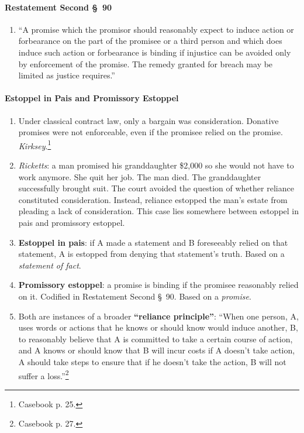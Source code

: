 \paragraph{Restatement Second \S\ 90}

\begin{enumerate}
    \item ``A promise which the promisor should reasonably expect to induce 
    action or forbearance on the part of the promisee or a third person and 
    which does induce such action or forbearance is binding if injustice can 
    be avoided only by enforcement of the promise. The remedy granted for 
    breach may be limited as justice requires.''
\end{enumerate}

\paragraph{Estoppel in Pais and Promissory Estoppel}

\begin{enumerate}
    \item Under classical contract law, only a bargain was consideration. 
    Donative promises were not enforceable, even if the promisee relied on the 
    promise. \emph{Kirksey}.\footnote{Casebook p. 25.}
    \item \emph{Ricketts}: a man promised his granddaughter \$2,000 so she 
    would not have to work anymore. She quit her job. The man died. The 
    granddaughter successfully brought suit. The court avoided the question of 
    whether reliance constituted consideration. Instead, reliance estopped the 
    man's estate from pleading a lack of consideration. This case lies 
    somewhere between estoppel in pais and promissory estoppel.
    \item \textbf{Estoppel in pais}: if A made a statement and B foreseeably 
    relied on that statement, A is estopped from denying that statement's 
    truth. Based on a \emph{statement of fact}.
    \item \textbf{Promissory estoppel}: a promise is binding if the promisee 
    reasonably relied on it. Codified in Restatement Second \S\ 90. Based on a 
    \emph{promise}.
    \item Both are instances of a broader \textbf{``reliance principle''}: 
    ``When one person, A, uses words or actions that he knows or should know 
    would induce another, B, to reasonably believe that A is committed to take 
    a certain course of action, and A knows or should know that B will incur 
    costs if A doesn't take action, A should take steps to ensure that if he 
    doesn't take the action, B will not suffer a loss.''\footnote{Casebook p. 
    27.}
\end{enumerate}

